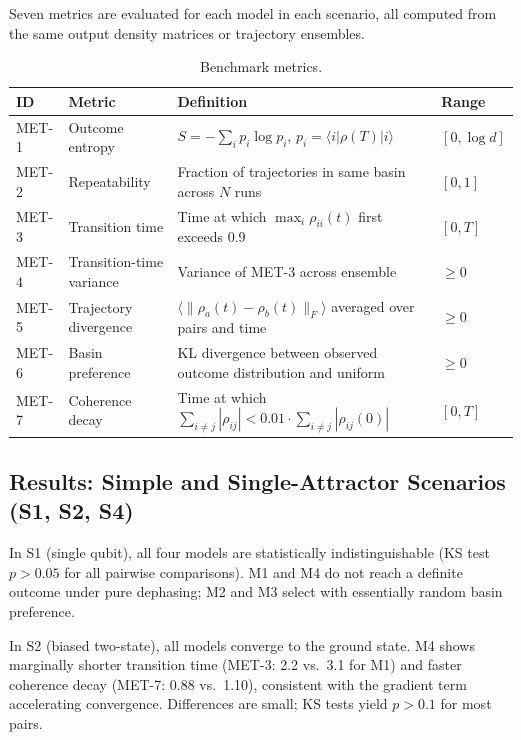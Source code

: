 \documentclass[12pt]{article}
\begin{document}
Seven metrics are evaluated for each model in each scenario, all computed from the same output density matrices or trajectory ensembles.

\begin{table}[ht]
\centering
\caption{Benchmark metrics.}
\label{tab:metrics}
\begin{tabular}{@{}llll@{}}
\toprule
ID    & Metric                   & Definition & Range \\
\midrule
MET-1 & Outcome entropy          & $S = -\sum_i p_i \log p_i$, $p_i = \langle i|\rho(T)|i\rangle$ & $[0, \log d]$ \\
MET-2 & Repeatability            & Fraction of trajectories in same basin across $N$ runs & $[0, 1]$ \\
MET-3 & Transition time          & Time at which $\max_i \rho_{ii}(t)$ first exceeds 0.9 & $[0, T]$ \\
MET-4 & Transition-time variance & Variance of MET-3 across ensemble & $\geq 0$ \\
MET-5 & Trajectory divergence    & $\langle \|\rho_a(t) - \rho_b(t)\|_F \rangle$ averaged over pairs and time & $\geq 0$ \\
MET-6 & Basin preference         & KL divergence between observed outcome distribution and uniform & $\geq 0$ \\
MET-7 & Coherence decay          & Time at which $\sum_{i \neq j}|\rho_{ij}| < 0.01 \cdot \sum_{i \neq j}|\rho_{ij}(0)|$ & $[0, T]$ \\
\bottomrule
\end{tabular}
\end{table}

\subsection{Results: Simple and Single-Attractor Scenarios (S1, S2, S4)}

In S1 (single qubit), all four models are statistically indistinguishable (KS test $p > 0.05$ for all pairwise comparisons). M1 and M4 do not reach a definite outcome under pure dephasing; M2 and M3 select with essentially random basin preference.

In S2 (biased two-state), all models converge to the ground state. M4 shows marginally shorter transition time (MET-3: 2.2 vs.\ 3.1 for M1) and faster coherence decay (MET-7: 0.88 vs.\ 1.10), consistent with the gradient term accelerating convergence. Differences are small; KS tests yield $p > 0.1$ for most pairs.
\end{document}

